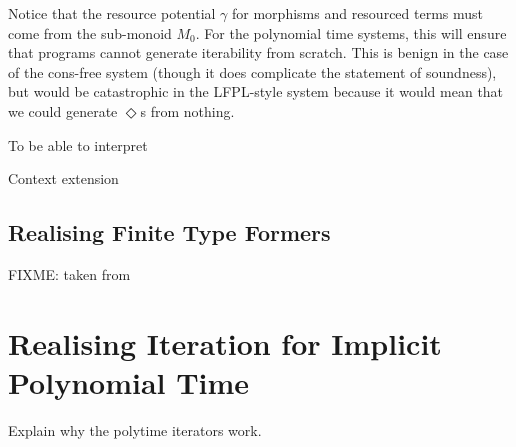 \documentclass[acmsmall,review]{acmart}
\begin{document}
Notice that the resource potential $\gamma$ for morphisms and
resourced terms must come from the sub-monoid $M_0$. For the
polynomial time systems, this will ensure that programs cannot
generate iterability from scratch. This is benign in the case of the
cons-free system (though it does complicate the statement of
soundness), but would be catastrophic in the LFPL-style system because
it would mean that we could generate $\Diamond$s from nothing.

To be able to interpret

\begin{definition}
  Context extension
\end{definition}

\subsection{Realising Finite Type Formers}

\begin{definition}[$\Pi$-types]
  FIXME: taken from
\end{definition}

\begin{definition}

\end{definition}

\begin{definition}

\end{definition}

\begin{definition}

\end{definition}

\section{Realising Iteration for Implicit Polynomial Time}
\label{sec:realising-iteration}

Explain why the polytime iterators work.

\begin{theorem}
  \label{thm:cons-free-soundness}
\end{theorem}
\end{document}
